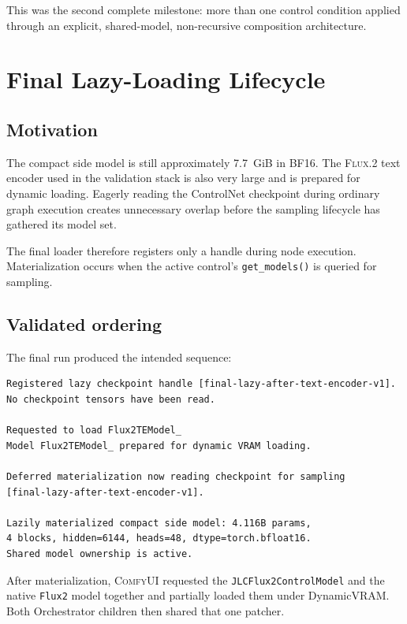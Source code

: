 \documentclass[11pt]{article}
\newcommand{\FluxTwo}{\textsc{Flux.2}}
\newcommand{\ComfyUI}{\textsc{ComfyUI}}
\newcommand{\code}[1]{\texttt{#1}}
\begin{document}
This was the second complete milestone: more than one control condition applied through an explicit, shared-model, non-recursive composition architecture.

\section{Final Lazy-Loading Lifecycle}

\subsection{Motivation}

The compact side model is still approximately 7.7~GiB in BF16. The \FluxTwo{} text encoder used in the validation stack is also very large and is prepared for dynamic loading. Eagerly reading the ControlNet checkpoint during ordinary graph execution creates unnecessary overlap before the sampling lifecycle has gathered its model set.

The final loader therefore registers only a handle during node execution. Materialization occurs when the active control's \code{get\_models()} is queried for sampling.

\subsection{Validated ordering}

The final run produced the intended sequence:

\begin{lstlisting}[style=textstyle,caption={Validated lazy-loading order.}]
Registered lazy checkpoint handle [final-lazy-after-text-encoder-v1].
No checkpoint tensors have been read.

Requested to load Flux2TEModel_
Model Flux2TEModel_ prepared for dynamic VRAM loading.

Deferred materialization now reading checkpoint for sampling
[final-lazy-after-text-encoder-v1].

Lazily materialized compact side model: 4.116B params,
4 blocks, hidden=6144, heads=48, dtype=torch.bfloat16.
Shared model ownership is active.
\end{lstlisting}

After materialization, \ComfyUI{} requested the \code{JLCFlux2ControlModel} and the native \code{Flux2} model together and partially loaded them under DynamicVRAM. Both Orchestrator children then shared that one patcher.
\end{document}
